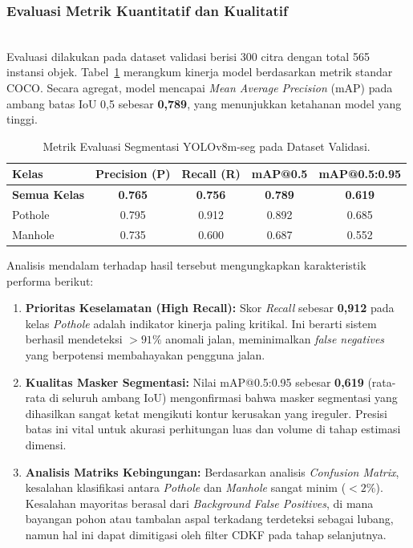 \documentclass{iopjournal}
\begin{document}
\subsubsection{Evaluasi Metrik Kuantitatif dan Kualitatif}
\mbox{}\\
Evaluasi dilakukan pada dataset validasi berisi 300 citra dengan total 565 instansi objek. Tabel~\ref{tab:yolo_metrics} merangkum kinerja model berdasarkan metrik standar COCO. Secara agregat, model mencapai \textit{Mean Average Precision} (mAP) pada ambang batas IoU 0,5 sebesar \textbf{0,789}, yang menunjukkan ketahanan model yang tinggi.

\begin{table}[h]
\caption{\label{tab:yolo_metrics}Metrik Evaluasi Segmentasi YOLOv8m-seg pada Dataset Validasi.}
\begin{center}
\begin{tabular}{lcccc}
\toprule
Kelas & Precision (P) & Recall (R) & mAP@0.5 & mAP@0.5:0.95 \\
\midrule
\textbf{Semua Kelas} & \textbf{0.765} & \textbf{0.756} & \textbf{0.789} & \textbf{0.619} \\
Pothole & 0.795 & 0.912 & 0.892 & 0.685 \\
Manhole & 0.735 & 0.600 & 0.687 & 0.552 \\
\bottomrule
\end{tabular}
\end{center}
\end{table}

Analisis mendalam terhadap hasil tersebut mengungkapkan karakteristik performa berikut:
\begin{enumerate}
    \item \textbf{Prioritas Keselamatan (High Recall):} Skor \textit{Recall} sebesar \textbf{0,912} pada kelas \textit{Pothole} adalah indikator kinerja paling kritikal. Ini berarti sistem berhasil mendeteksi $>91\%$ anomali jalan, meminimalkan \textit{false negatives} yang berpotensi membahayakan pengguna jalan.
    \item \textbf{Kualitas Masker Segmentasi:} Nilai mAP@0.5:0.95 sebesar \textbf{0,619} (rata-rata di seluruh ambang IoU) mengonfirmasi bahwa masker segmentasi yang dihasilkan sangat ketat mengikuti kontur kerusakan yang ireguler. Presisi batas ini vital untuk akurasi perhitungan luas dan volume di tahap estimasi dimensi.
    \item \textbf{Analisis Matriks Kebingungan:} Berdasarkan analisis \textit{Confusion Matrix}, kesalahan klasifikasi antara \textit{Pothole} dan \textit{Manhole} sangat minim ($<2\%$). Kesalahan mayoritas berasal dari \textit{Background False Positives}, di mana bayangan pohon atau tambalan aspal terkadang terdeteksi sebagai lubang, namun hal ini dapat dimitigasi oleh filter CDKF pada tahap selanjutnya.
\end{enumerate}
\end{document}
